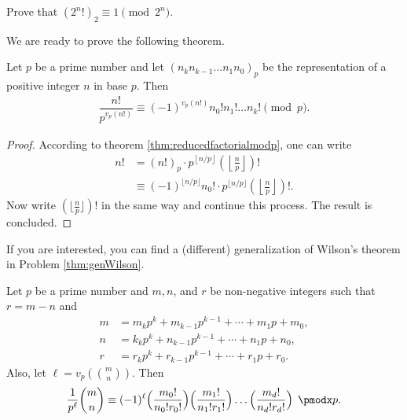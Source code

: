 \documentclass{subfile}
\begin{document}
	\begin{problem}
		Prove that $(2^n!)_2 \equiv 1 \pmod{2^n}$.
	\end{problem}
	
We are ready to prove the following theorem.

	\begin{theorem}\label{thm:wilsongeneral}
		Let $p$ be a prime number and let $(n_k n_{k-1}\ldots n_1 n_0)_p$ be the representation of a positive integer $n$ in base $p$. Then
			\begin{align}\label{eq:wilsongeneral}
				\dfrac{n!}{p^{v_p(n!)}}\equiv (-1)^{v_p(n!)} n_0!n_1!\dots n_k!\pmod p.
			\end{align}
	\end{theorem}
	
	\begin{proof}
		According to theorem \eqref{thm:reducedfactorialmodp}, one can write
			\begin{align*}
				n! &= (n!)_p \cdot p^{\left\lfloor n/p\right\rfloor}\left(\left\lfloor\frac{n}{p}\right\rfloor\right)!\\
				&\equiv (-1)^{\lfloor n/p\rfloor} n_0! \cdot p^{\lfloor n/p \rfloor}\left(\left\lfloor\frac{n}{p}\right\rfloor\right)!.
			\end{align*}
		Now write $(\lfloor \frac np\rfloor)!$ in the same way and continue this process. The result is concluded.
	\end{proof}
	
	\begin{note}
		If you are interested, you can find a (different) generalization of Wilson's theorem in Problem \ref{thm:genWilson}.
	\end{note}
	\begin{theorem}
		Let $p$ be a prime number and $m, n$, and $r$ be non-negative integers such that $r=m-n$ and
			\begin{align*}
				m&=m_kp^k+m_{k-1}p^{k-1}+\cdots +m_1p+m_0,\\
				n&=k_kp^k+n_{k-1}p^{k-1}+\cdots +n_1p+n_0,\\
				r&=r_kp^k+r_{k-1}p^{k-1}+\cdots +r_1p+r_0.
			\end{align*}
		Also, let $\ell = v_p\left(\binom{m}{n}\right)$. Then
			\begin{align*}
				\frac1{p^\ell}\binom{m}{n}\equiv (-1)^\ell
				\Bigl(\frac{m_0!}{n_0!r_0!}\Bigr) \Bigl(\frac{m_1!}{n_1!r_1!}\Bigr) \dots \Bigl(\frac{m_d!}{n_d!r_d!}\Bigr) \pmod p.
			\end{align*}
	\end{theorem}
	
\end{document}
